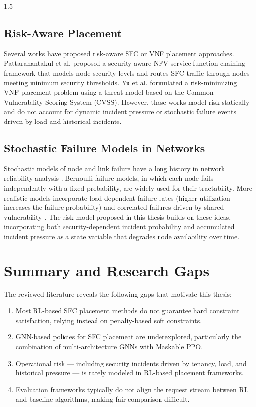\documentclass[A4paper,12pt]{report}
\theoremstyle{plain}
\theoremstyle{definition}
\theoremstyle{remark}
\numberwithin{equation}{section}
\begin{document}
\begin{spacing}{1.5}
\subsection{Risk-Aware Placement}

Several works have proposed risk-aware SFC or VNF placement approaches. Pattaranantakul et al. \cite{pattaranantakul2016} proposed a security-aware NFV service function chaining framework that models node security levels and routes SFC traffic through nodes meeting minimum security thresholds. Yu et al. \cite{yu2021} formulated a risk-minimizing VNF placement problem using a threat model based on the Common Vulnerability Scoring System (CVSS). However, these works model risk statically and do not account for dynamic incident pressure or stochastic failure events driven by load and historical incidents.

\subsection{Stochastic Failure Models in Networks}

Stochastic models of node and link failure have a long history in network reliability analysis \cite{barlow1975}. Bernoulli failure models, in which each node fails independently with a fixed probability, are widely used for their tractability. More realistic models incorporate load-dependent failure rates (higher utilization increases the failure probability) and correlated failures driven by shared vulnerability \cite{yago2019}. The risk model proposed in this thesis builds on these ideas, incorporating both security-dependent incident probability and accumulated incident pressure as a state variable that degrades node availability over time.

\section{Summary and Research Gaps}

The reviewed literature reveals the following gaps that motivate this thesis:

\begin{enumerate}
  \item Most RL-based SFC placement methods do not guarantee hard constraint satisfaction, relying instead on penalty-based soft constraints.
  \item GNN-based policies for SFC placement are underexplored, particularly the combination of multi-architecture GNNs with Maskable PPO.
  \item Operational risk — including security incidents driven by tenancy, load, and historical pressure — is rarely modeled in RL-based placement frameworks.
  \item Evaluation frameworks typically do not align the request stream between RL and baseline algorithms, making fair comparison difficult.
\end{enumerate}


\end{spacing}
\end{document}
